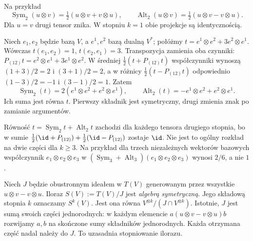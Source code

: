 Na przykład
\[
 \operatorname{Sym}_2(u\otimes v)
 =\tfrac12(u\otimes v+v\otimes u),\qquad
 \operatorname{Alt}_2(u\otimes v)
 =\tfrac12(u\otimes v-v\otimes u).
\]
Dla $u=v$ drugi tensor znika. W stopniu $k=1$ obie
projekcje są identycznością.

\begin{przyklad}
Niech $e_1,e_2$ będzie bazą $V$, a $e^1,e^2$ bazą dualną $V^*$; połóżmy
$t=e^1\otimes e^2+3e^2\otimes e^1$.
Wówczas $t(e_1,e_2)=1$, $t(e_2,e_1)=3$.
Transpozycja zamienia oba czynniki:
$P_{(12)}t=e^2\otimes e^1+3e^1\otimes e^2$.
W średniej $\tfrac12(t+P_{(12)}t)$ współczynniki
wynoszą $(1+3)/2=2$ i $(3+1)/2=2$,
a w różnicy $\tfrac12(t-P_{(12)}t)$ odpowiednio
$(1-3)/2=-1$ i $(3-1)/2=1$. Zatem
\[
 \operatorname{Sym}_2(t)
 =2(e^1\otimes e^2+e^2\otimes e^1),\qquad
 \operatorname{Alt}_2(t)
 =-e^1\otimes e^2+e^2\otimes e^1.
\]
Ich suma jest równa $t$. Pierwszy składnik jest symetryczny,
drugi zmienia znak po zamianie argumentów.
\end{przyklad}

Równość $t=\operatorname{Sym}_2t+\operatorname{Alt}_2t$
zachodzi dla każdego tensora drugiego stopnia, bo w sumie
$\tfrac12(\id+P_{(12)})+\tfrac12(\id-P_{(12)})$ zostaje $\id$.
Nie jest to ogólny rozkład na dwie części dla $k\geq3$.
Na przykład dla trzech niezależnych wektorów bazowych
współczynnik $e_1\otimes e_2\otimes e_3$ w
$(\operatorname{Sym}_3+\operatorname{Alt}_3)
(e_1\otimes e_2\otimes e_3)$ wynosi $2/6$, a nie $1$.

\begin{definicja}
\label{def:algebra-symetryczna}
Niech $J$ będzie obustronnym ideałem w $T(V)$ generowanym
przez wszystkie $u\otimes v-v\otimes u$. Iloraz
$S(V):=T(V)/J$ jest \emph{algebrą symetryczną}.
Jego składową stopnia $k$ oznaczamy $S^k(V)$.
Jest ona równa $V^{\otimes k}/(J\cap V^{\otimes k})$.
Istotnie, $J$ jest sumą swoich części jednorodnych:
w każdym elemencie $a(u\otimes v-v\otimes u)b$ rozwijamy
$a,b$ na skończone sumy składników jednorodnych. Każda
otrzymana część nadal należy do $J$. To uzasadnia stopniowanie ilorazu.
\end{definicja}

